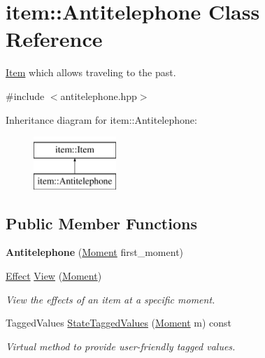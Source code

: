 \hypertarget{classitem_1_1_antitelephone}{}\section{item\+:\+:Antitelephone Class Reference}
\label{classitem_1_1_antitelephone}


\hyperlink{classitem_1_1_item}{Item} which allows traveling to the past.  




{\ttfamily \#include $<$antitelephone.\+hpp$>$}

Inheritance diagram for item\+:\+:Antitelephone\+:\begin{figure}[H]
\begin{center}
\leavevmode
\includegraphics[height=2.000000cm]{classitem_1_1_antitelephone}
\end{center}
\end{figure}
\subsection*{Public Member Functions}
\begin{DoxyCompactItemize}
\item 
\mbox{\label{classitem_1_1_antitelephone_a832d79223e555ae7dd69d11377392731}} 
{\bfseries Antitelephone} (\hyperlink{classtimeplane_1_1_moment}{Moment} first\+\_\+moment)
\item 
\hyperlink{classitem_1_1_effect}{Effect} \hyperlink{classitem_1_1_antitelephone_aa44819e9242edbdfdfc4f14b5d2b34ec}{View} (\hyperlink{classtimeplane_1_1_moment}{Moment})
\begin{DoxyCompactList}\small\item\em View the effects of an item at a specific moment. \end{DoxyCompactList}\item 
Tagged\+Values \hyperlink{classitem_1_1_antitelephone_afe8ac703b5f19181f221afe07c05cae7}{State\+Tagged\+Values} (\hyperlink{classtimeplane_1_1_moment}{Moment} m) const
\begin{DoxyCompactList}\small\item\em Virtual method to provide user-\/friendly tagged values. \end{DoxyCompactList}\end{DoxyCompactItemize}
